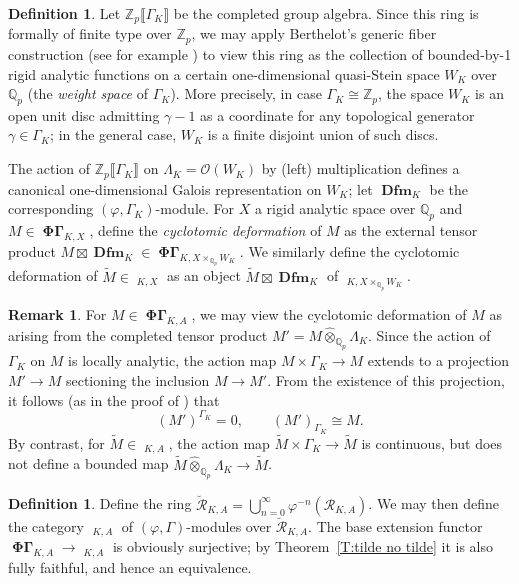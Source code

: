 \documentclass[12pt]{amsart}
\theoremstyle{definition}
\newtheorem{defn}[theorem]{Definition}
\newtheorem{remark}[theorem]{Remark}
\numberwithin{equation}{theorem}
\newcommand{\Qp}{\mathbb{Q}_p}
\newcommand{\QQ}{\mathbb{Q}}
\newcommand{\ZZ}{\mathbb{Z}}
\newcommand{\calO}{\mathcal{O}}
\newcommand{\calR}{\mathcal{R}}
\DeclareMathOperator{\Dfm}{\mathbf{Dfm}}
\DeclareMathOperator{\PhiGamma}{\mathbf{\Phi \Gamma}}
\DeclareMathOperator{\PhiGammabreve}{\breve{\mathbf{\Phi \Gamma}}}
\DeclareMathOperator{\PhiGammatilde}{\widetilde{\mathbf{\Phi \Gamma}}}
\begin{document}
\begin{defn}
Let $\ZZ_p \llbracket \Gamma_K \rrbracket$ be the completed group algebra.
Since this ring is formally of finite type over $\ZZ_p$, we may apply Berthelot's generic fiber construction (see for example \cite[\S 7]{dejong-crys})
to view this ring as the collection of bounded-by-1 rigid analytic functions on a certain one-dimensional quasi-Stein space $W_K$ over $\QQ_p$ (the \emph{weight space} of $\Gamma_K$).
More precisely, in case $\Gamma_K \cong \ZZ_p$, the space $W_K$ is an open unit disc admitting $\gamma-1$ as a coordinate for any topological generator $\gamma \in \Gamma_K$; in the general case, $W_K$ is a finite disjoint union of such discs.

The action of $\ZZ_p \llbracket \Gamma_K \rrbracket$ on $\Lambda_K = \calO(W_K)$ by (left) multiplication
defines a canonical one-dimensional Galois representation on $W_K$; let $\Dfm_{K}$ be the corresponding $(\varphi, \Gamma_K)$-module.
For $X$ a rigid analytic space over $\QQ_p$ and $M \in \PhiGamma_{K,X}$,
define the \emph{cyclotomic deformation} of $M$
as the external tensor product $M \boxtimes \Dfm_{K} \in \PhiGamma_{K,X \times_{\Qp} W_K}$. We similarly define the cyclotomic deformation of $\tilde{M} \in \PhiGammatilde_{K,X}$ as an object $\tilde{M} \boxtimes \Dfm_{K}$ of $\PhiGammatilde_{K,X \times_{\Qp} W_K}$.
\end{defn}

\begin{remark} \label{R:Gamma acyclic}
For $M \in \PhiGamma_{K,A}$, we may view the cyclotomic deformation of $M$ as arising from the completed tensor product $M' = M \widehat{\otimes}_{\Qp} \Lambda_K$. Since the action of $\Gamma_K$ on $M$ is locally analytic, the action map $M \times \Gamma_K \to M$ extends to a projection $M' \to M$ sectioning the inclusion $M \to M'$. From the existence of this projection, it follows (as in the proof of \cite[Theorem~4.4.8]{kpx}) that 
\[
(M')^{\Gamma_K} = 0, \qquad (M')_{\Gamma_K} \cong M.
\]
By contrast, for $\tilde{M} \in \PhiGammatilde_{K,A}$, the action map
$\tilde{M} \times \Gamma_K \to \tilde{M}$ is continuous, but does not define a bounded map
$\tilde{M} \widehat{\otimes}_{\QQ_p} \Lambda_K \to \tilde{M}$.
\end{remark}

\begin{defn}
Define the ring $\breve{\calR}_{K,A} = \bigcup_{n=0}^\infty \varphi^{-n}(\calR_{K,A})$.
We may then define the category $\PhiGammabreve_{K,A}$ of $(\varphi, \Gamma)$-modules over $\breve{\calR}_{K,A}$. The base extension functor $\PhiGamma_{K,A} \to \PhiGammabreve_{K,A}$ is obviously surjective; by Theorem~\ref{T:tilde no tilde} it is also fully faithful, and hence an equivalence.
\end{defn}
\end{document}
